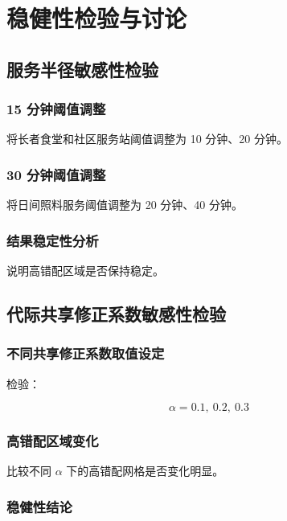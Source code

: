 \section{稳健性检验与讨论}

\subsection{服务半径敏感性检验}

\subsubsection{15 分钟阈值调整}

将长者食堂和社区服务站阈值调整为 10 分钟、20 分钟。

\subsubsection{30 分钟阈值调整}

将日间照料服务阈值调整为 20 分钟、40 分钟。

\subsubsection{结果稳定性分析}

说明高错配区域是否保持稳定。

\subsection{代际共享修正系数敏感性检验}

\subsubsection{不同共享修正系数取值设定}

检验：

\begin{equation}
\alpha = 0.1,\ 0.2,\ 0.3
\end{equation}

\subsubsection{高错配区域变化}

比较不同 $\alpha$ 下的高错配网格是否变化明显。

\subsubsection{稳健性结论}

